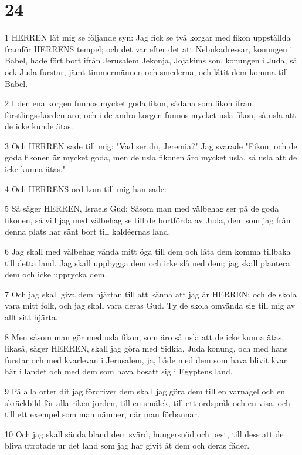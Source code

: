 \chapter{24}

\par 1 HERREN lät mig se följande syn: Jag fick se två korgar med fikon uppställda framför HERRENS tempel; och det var efter det att Nebukadressar, konungen i Babel, hade fört bort ifrån Jerusalem Jekonja, Jojakims son, konungen i Juda, så ock Juda furstar, jämt timmermännen och smederna, och låtit dem komma till Babel.
\par 2 I den ena korgen funnos mycket goda fikon, sådana som fikon ifrån förstlingsskörden äro; och i de andra korgen funnos mycket usla fikon, så usla att de icke kunde ätas.
\par 3 Och HERREN sade till mig: "Vad ser du, Jeremia?" Jag svarade "Fikon; och de goda fikonen är mycket goda, men de usla fikonen äro mycket usla, så usla att de icke kunna ätas."
\par 4 Och HERRENS ord kom till mig han sade:
\par 5 Så säger HERREN, Israels Gud: Såsom man med välbehag ser på de goda fikonen, så vill jag med välbehag se till de bortförda av Juda, dem som jag från denna plats har sänt bort till kaldéernas land.
\par 6 Jag skall med välbehag vända mitt öga till dem och låta dem komma tillbaka till detta land. Jag skall uppbygga dem och icke slå ned dem; jag skall plantera dem och icke upprycka dem.
\par 7 Och jag skall giva dem hjärtan till att känna att jag är HERREN; och de skola vara mitt folk, och jag skall vara deras Gud. Ty de skola omvända sig till mig av allt sitt hjärta.
\par 8 Men såsom man gör med usla fikon, som äro så usla att de icke kunna ätas, likaså, säger HERREN, skall jag göra med Sidkia, Juda konung, och med hans furstar och med kvarlevan i Jerusalem, ja, både med dem som hava blivit kvar här i landet och med dem som hava bosatt sig i Egyptens land.
\par 9 På alla orter dit jag fördriver dem skall jag göra dem till en varnagel och en skräckbild för alla riken jorden, till en smälek, till ett ordspråk och en visa, och till ett exempel som man nämner, när man förbannar.
\par 10 Och jag skall sända bland dem svärd, hungersnöd och pest, till dess att de bliva utrotade ur det land som jag har givit åt dem och deras fäder.

